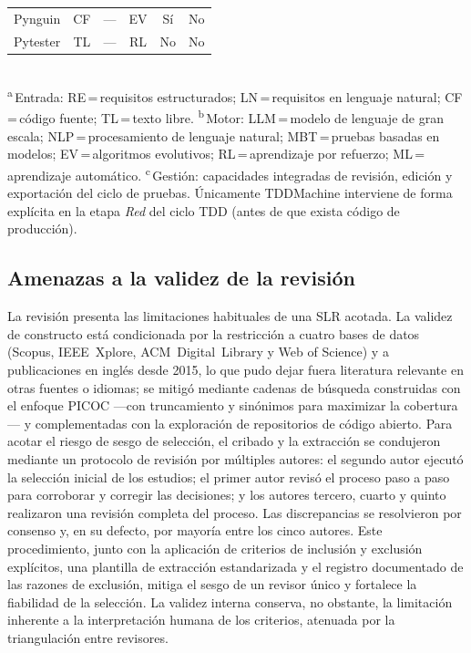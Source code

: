 \documentclass[10pt,journal,twoside,letterpaper]{IEEEtran}
\begin{document}
\begin{table}[!tb]
\begin{tabular}{@{}lccccc@{}}
			Pynguin \cite{lukasczyk2022pynguin}         & CF & ---   & EV    & Sí   & No \\
			Pytester \cite{takerngsaksiri2025pytester}  & TL & ---   & RL    & No   & No \\
			\bottomrule
		\end{tabular}
		\\[3pt]
		{\footnotesize \textsuperscript{a}\,Entrada: RE\,=\,requisitos estructurados; LN\,=\,requisitos en lenguaje natural; CF\,=\,código fuente; TL\,=\,texto libre. \textsuperscript{b}\,Motor: LLM\,=\,modelo de lenguaje de gran escala; NLP\,=\,procesamiento de lenguaje natural; MBT\,=\,pruebas basadas en modelos; EV\,=\,algoritmos evolutivos; RL\,=\,aprendizaje por refuerzo; ML\,=\,aprendizaje automático. \textsuperscript{c}\,Gestión: capacidades integradas de revisión, edición y exportación del ciclo de pruebas. Únicamente TDDMachine interviene de forma explícita en la etapa \emph{Red} del ciclo TDD (antes de que exista código de producción).}
	\end{table}

	\subsection{Amenazas a la validez de la revisión}
	\label{subsec:amenazas}

	La revisión presenta las limitaciones habituales de una SLR acotada. La validez de constructo está condicionada por la restricción a cuatro bases de datos (Scopus, IEEE~Xplore, ACM~Digital~Library y Web of Science) y a publicaciones en inglés desde 2015, lo que pudo dejar fuera literatura relevante en otras fuentes o idiomas; se mitigó mediante cadenas de búsqueda construidas con el enfoque PICOC ---con truncamiento y sinónimos para maximizar la cobertura--- y complementadas con la exploración de repositorios de código abierto. Para acotar el riesgo de sesgo de selección, el cribado y la extracción se condujeron mediante un protocolo de revisión por múltiples autores: el segundo autor ejecutó la selección inicial de los estudios; el primer autor revisó el proceso paso a paso para corroborar y corregir las decisiones; y los autores tercero, cuarto y quinto realizaron una revisión completa del proceso. Las discrepancias se resolvieron por consenso y, en su defecto, por mayoría entre los cinco autores. Este procedimiento, junto con la aplicación de criterios de inclusión y exclusión explícitos, una plantilla de extracción estandarizada y el registro documentado de las razones de exclusión, mitiga el sesgo de un revisor único y fortalece la fiabilidad de la selección. La validez interna conserva, no obstante, la limitación inherente a la interpretación humana de los criterios, atenuada por la triangulación entre revisores.
\end{document}
